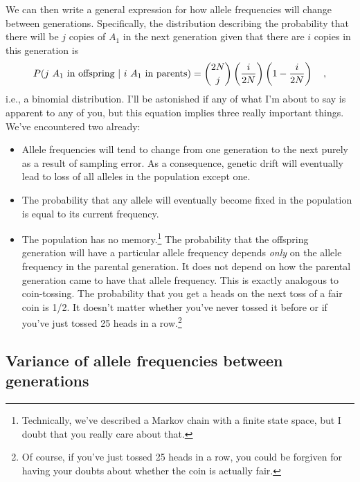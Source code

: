 \documentclass[12pt]{article}
\begin{document}
We can then write a general expression for how allele frequencies will
change between generations. Specifically, the distribution
describing the probability that there will be $j$ copies of $A_1$ in
the next generation given that there are $i$ copies in this generation
is
\[
P(\hbox{$j$ $A_1$ in offspring $|$ $i$ $A_1$ in parents}) =
{2N \choose j}\left(\frac{i}{2N}\right)\left(1 - \frac{i}{2N}\right)
\quad ,
\]
i.e., a binomial distribution. I'll be astonished if any of what I'm about to say is
apparent to any of you, but this equation implies three really
important things. We've encountered two already:

\begin{itemize}

\item Allele frequencies will tend to change from one generation to
the next purely as a result of sampling error. As a consequence,
genetic drift will eventually lead to loss of all alleles in the
population except one.

\item The probability that any allele will eventually become fixed in
the population is equal to its current frequency.

\item The population has no memory.\footnote{Technically, we've
described a Markov chain with a finite state space, but I doubt that
you really care about that.} The probability that the offspring
generation will have a particular allele frequency depends {\it
only\/} on the allele frequency in the parental generation. It does
not depend on how the parental generation came to have that allele
frequency. This is exactly analogous to coin-tossing. The probability
that you get a heads on the next toss of a fair coin is 1/2. It
doesn't matter whether you've never tossed it before or if you've just
tossed 25 heads in a row.\footnote{Of course, if you've just tossed 25
heads in a row, you could be forgiven for having your doubts about
whether the coin is actually fair.}

\end{itemize}

\subsection*{Variance of allele frequencies between
  generations}
\end{document}
